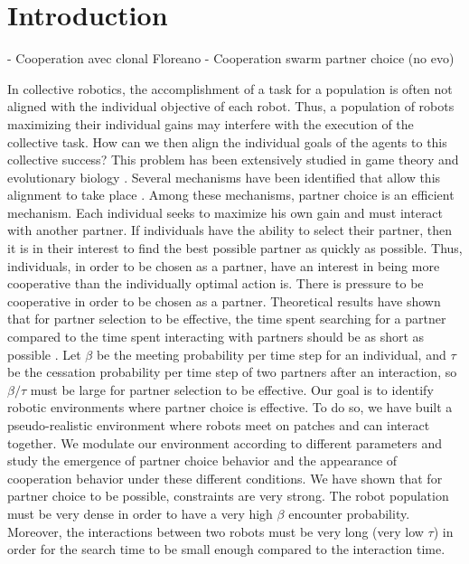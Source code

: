 

\section{Introduction}

- Cooperation avec clonal Floreano
- Cooperation swarm partner choice (no evo) \cite{Aktipis2011}


In collective robotics, the accomplishment of a task for a population is often not aligned with the individual objective of each robot. Thus, a population of robots maximizing their individual gains may interfere with the execution of the collective task. How can we then align the individual goals of the agents to this collective success? This problem has been extensively studied in game theory and evolutionary biology \citep{Axelrod1981}. Several mechanisms have been identified that allow this alignment to take place \citep{West2007a}. Among these mechanisms, partner choice is an efficient mechanism. Each individual seeks to maximize his own gain and must interact with another partner. If individuals have the ability to select their partner, then it is in their interest to find the best possible partner as quickly as possible. Thus, individuals, in order to be chosen as a partner, have an interest in being more cooperative than the individually optimal action is. There is pressure to be cooperative in order to be chosen as a partner. Theoretical results have shown that for partner selection to be effective, the time spent searching for a partner compared to the time spent interacting with partners should be as short as possible \citep{Debove2015b}. Let $\beta$ be the meeting probability per time step for an individual, and $\tau$ be the cessation probability per time step of two partners after an interaction, so $\beta / \tau$ must be large for partner selection to be effective. Our goal is to identify robotic environments where partner choice is effective. To do so, we have built a pseudo-realistic environment where robots meet on patches and can interact together. We modulate our environment according to different parameters and study the emergence of partner choice behavior and the appearance of cooperation behavior under these different conditions. We have shown that for partner choice to be possible, constraints are very strong. The robot population must be very dense in order to have a very high $\beta$ encounter probability. Moreover, the interactions between two robots must be very long (very low $\tau$) in order for the search time to be small enough compared to the interaction time.

